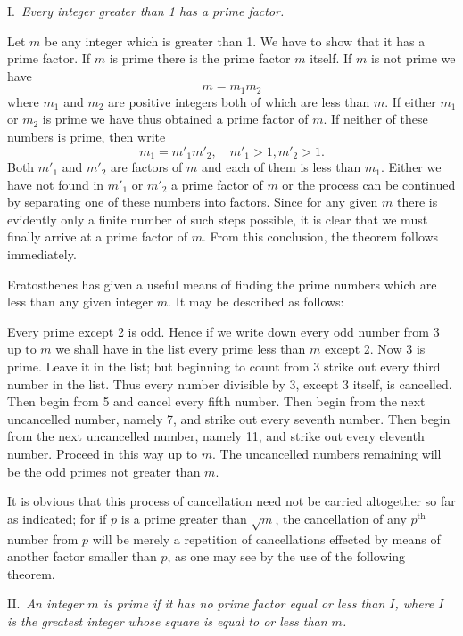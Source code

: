 \documentclass[oneside]{book}
\begin{document}
\smallskip I.~\emph{Every integer greater than 1 has a prime factor.}

Let $m$ be any integer which is greater than 1. We have to show that
it has a prime factor. If $m$ is prime there is the prime factor $m$
itself. If $m$ is not prime we have
\begin{equation*}
m = m_1 m_2
\end{equation*}
where $m_1$ and $m_2$ are positive integers both of which are less
than $m$. If either $m_1$ or $m_2$ is prime we have thus obtained a
prime factor of $m$. If neither of these numbers is prime, then
write
\begin{equation*}
m_1 = m'_1 m'_2,\quad m'_1 > 1, m'_2 > 1.
\end{equation*}
Both $m'_1$ and $m'_2$ are factors of $m$ and each of them is less
than $m_1$. Either we have not found in $m'_1$ or $m'_2$ a prime
factor of $m$ or the process can be continued by separating one of
these numbers into factors. Since for any given $m$ there is
evidently only a finite number of such steps possible, it is clear
that we must finally arrive at a prime factor of $m$. From this
conclusion, the theorem follows immediately.

Eratosthenes has given a useful means of finding the prime numbers
which are less than any given integer $m$. It may be described as
follows:

Every prime except 2 is odd. Hence if we write down every odd number
from 3 up to $m$ we shall have in the list every prime less than $m$
except 2. Now 3 is prime. Leave it in the list; but beginning to
count from 3 strike out every third number in the list. Thus every
number divisible by 3, except 3 itself, is cancelled. Then begin
from 5 and cancel every fifth number. Then begin from the next
uncancelled number, namely 7, and strike out every seventh number.
Then begin from the next uncancelled number, namely 11, and strike
out every eleventh number. Proceed in this way up to $m$. The
uncancelled numbers remaining will be the odd primes not greater
than $m$.

It is obvious that this process of cancellation need not be carried
altogether so far as indicated; for if $p$ is a prime greater than
$\sqrt{m}$, the cancellation of any $p^\text{th}$ number from $p$
will be merely a repetition of cancellations effected by means of
another factor smaller than $p$, as one may see by the use of the
following theorem.

\smallskip II.~\emph{An integer $m$ is prime if it has no prime
factor equal or less than $I$, where $I$ is the greatest integer
whose square is equal to or less than $m$.}
\end{document}

